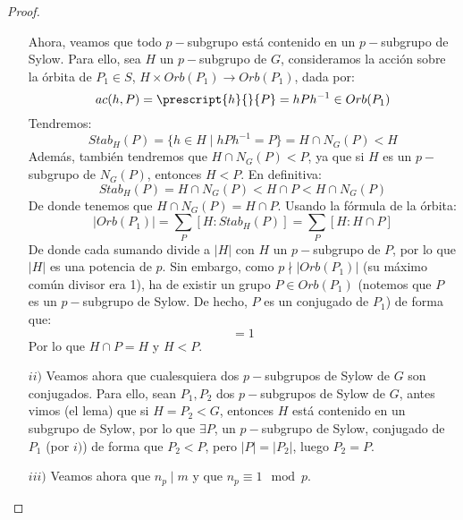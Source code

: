 \begin{teo}
\begin{proof}
\begin{enumerate}
                \noindent
                Ahora, veamos que todo $p-$subgrupo está contenido en un $p-$subgrupo de Sylow. Para ello, sea $H$ un $p-$subgrupo de $G$, consideramos la acción sobre la órbita de $P_1\in S$, $H\times Orb(P_1)\to Orb(P_1)$, dada por:
                \begin{equation*}
                    ac(h,P) = \prescript{h}{}{P} = hPh^{-1} \in Orb(P_1)
                \end{equation*}
                Tendremos:
                \begin{equation*}
                    Stab_H(P) = \{h\in H \mid hPh^{-1} = P\} = H\cap N_G(P) < H
                \end{equation*}
                Además, también tendremos que $H\cap N_G(P) < P$, ya que si $H$ es un $p-$subgrupo de $N_G(P)$, entonces $H<P$. En definitiva:
                \begin{equation*}
                    Stab_H(P) = H\cap N_G(P) < H\cap P < H\cap N_G(P)
                \end{equation*}
                De donde tenemos que $H\cap N_G(P) = H \cap P$. Usando la fórmula de la órbita: %
                \begin{equation*}
                    |Orb(P_1)| = \sum_{P} [H:Stab_H(P)] = \sum_{P} [H:H\cap P]
                \end{equation*}
                De donde cada sumando divide a $|H|$ con $H$ un $p-$subgrupo de $P$, por lo que $|H|$ es una potencia de $p$. Sin embargo, como $p \nmid |Orb(P_1)|$ (su máximo común divisor era 1), ha de existir un grupo $P\in Orb(P_1)$ (notemos que $P$ es un $p-$subgrupo de Sylow. De hecho, $P$ es un conjugado de $P_1$) de forma que:
                \begin{equation*}
                    [H:H\cap P] = 1
                \end{equation*}
                Por lo que $H\cap P = H$ y $H<P$.
            \item[$ii)$] Veamos ahora que cualesquiera dos $p-$subgrupos de Sylow de $G$ son conjugados. Para ello, sean $P_1,P_2$ dos $p-$subgrupos de Sylow de $G$, antes vimos (el lema) que si $H = P_2<G$, entonces $H$ está contenido en un subgrupo de Sylow, por lo que $\exists P$, un $p-$subgrupo de Sylow, conjugado de $P_1$ (por $i)$) de forma que $P_2 < P$, pero $|P| = |P_2|$, luego $P_2 = P$.
            \item[$iii)$] Veamos ahora que $n_p\mid m$ y que $n_p\equiv 1 \mod p$.\newline


\end{enumerate}
\end{proof}
\end{teo}
